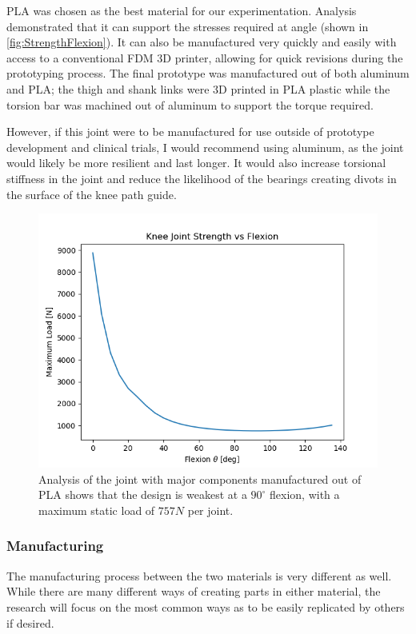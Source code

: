 PLA was chosen as the best material for our experimentation. Analysis demonstrated that it can support the stresses required at angle (shown in \autoref{fig:StrengthFlexion}). It can also be manufactured very quickly and easily with access to a conventional FDM 3D printer, allowing for quick revisions during the prototyping process. The final prototype was manufactured out of both aluminum and PLA; the thigh and shank links were 3D printed in PLA plastic while the torsion bar was machined out of aluminum to support the torque required.

However, if this joint were to be manufactured for use outside of prototype development and clinical trials, I would recommend using aluminum, as the joint would likely be more resilient and last longer. It would also increase torsional stiffness in the joint and reduce the likelihood of the bearings creating divots in the surface of the knee path guide.

\begin{figure}[ht!]
    \centering
    \includegraphics[width=0.8\linewidth]{Figures/Design/StrengthFlexionCurve.png}
    \caption{Analysis of the joint with major components manufactured out of PLA shows that the design is weakest at a \(90^\circ\) flexion, with a maximum static load of \(757N\) per joint.}
    \label{fig:StrengthFlexion}
\end{figure}

\subsubsection{Manufacturing}

The manufacturing process between the two materials is very different as well. While there are many different ways of creating parts in either material, the research will focus on the most common ways as to be easily replicated by others if desired.

